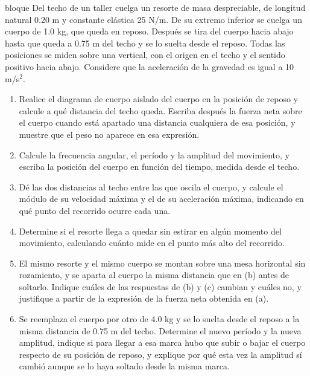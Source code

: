 \documentclass[11pt,openany]{book}
\begin{document}
\begin{ejercicio}{bloque}
Del techo de un taller cuelga un resorte de masa despreciable, de longitud natural 0.20 m y constante elástica 25 N/m. De su extremo inferior se cuelga un cuerpo de 1.0 kg, que queda en reposo. Después se tira del cuerpo hacia abajo hasta que queda a 0.75 m del techo y se lo suelta desde el reposo. Todas las posiciones se miden sobre una vertical, con el origen en el techo y el sentido positivo hacia abajo. Considere que la aceleración de la gravedad es igual a 10 m/s$^2$.
\begin{enumerate}[label=(\alph*), leftmargin=1.7em, itemsep=1pt, topsep=3pt]
  \item Realice el diagrama de cuerpo aislado del cuerpo en la posición de reposo y calcule a qué distancia del techo queda. Escriba después la fuerza neta sobre el cuerpo cuando está apartado una distancia cualquiera de esa posición, y muestre que el peso no aparece en esa expresión.
  \item Calcule la frecuencia angular, el período y la amplitud del movimiento, y escriba la posición del cuerpo en función del tiempo, medida desde el techo.
  \item Dé las dos distancias al techo entre las que oscila el cuerpo, y calcule el módulo de su velocidad máxima y el de su aceleración máxima, indicando en qué punto del recorrido ocurre cada una.
  \item Determine si el resorte llega a quedar sin estirar en algún momento del movimiento, calculando cuánto mide en el punto más alto del recorrido.
  \item El mismo resorte y el mismo cuerpo se montan sobre una mesa horizontal sin rozamiento, y se aparta al cuerpo la misma distancia que en (b) antes de soltarlo. Indique cuáles de las respuestas de (b) y (c) cambian y cuáles no, y justifique a partir de la expresión de la fuerza neta obtenida en (a).
  \item Se reemplaza el cuerpo por otro de 4.0 kg y se lo suelta desde el reposo a la misma distancia de 0.75 m del techo. Determine el nuevo período y la nueva amplitud, indique si para llegar a esa marca hubo que subir o bajar el cuerpo respecto de su posición de reposo, y explique por qué esta vez la amplitud sí cambió aunque se lo haya soltado desde la misma marca.
\end{enumerate}
\end{ejercicio}
\end{document}
